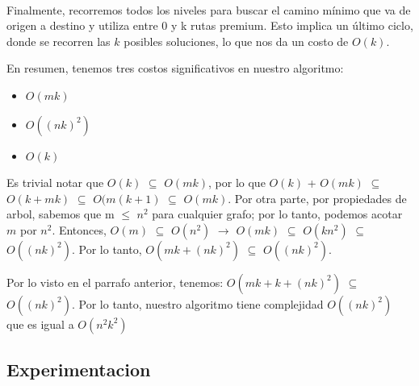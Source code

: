 \\
\par
Finalmente, recorremos todos los niveles para buscar el camino mínimo que va de origen a destino y utiliza entre 0 y k rutas premium. Esto implica un último ciclo, donde se recorren las $k$ posibles soluciones, lo que nos da un costo de $O(k)$.
\\
\par
En resumen, tenemos tres costos significativos en nuestro algoritmo:
\begin{itemize}
\item $O(mk)$
\item $O((nk)^2)$
\item $O(k)$
\end{itemize}
Es trivial notar que $O(k)$ $\subseteq$ $O(mk)$, por lo que $O(k)$ + $O(mk)$ $\subseteq$ $O(k + mk)$ $\subseteq$ $O(m(k+1)$ $\subseteq$ $O(mk)$. Por otra parte, por propiedades de arbol, sabemos que m $\leq$ $n^2$ para cualquier grafo; por lo tanto, podemos acotar $m$ por $n^2$. Entonces, $O(m)$ $\subseteq$ $O(n^2)$ $\rightarrow$ $O(mk)$ $\subseteq$ $O(kn^2)$ $\subseteq$ $O((nk)^2)$. Por lo tanto, $O(mk + (nk)^2)$ $\subseteq$ $O((nk)^2)$.
\\
\par
Por lo visto en el parrafo anterior, tenemos: $O(mk + k + (nk)^2)$ $\subseteq$ $O((nk)^2)$. Por lo tanto, nuestro algoritmo tiene complejidad $O((nk)^2)$ que es igual a $O(n^2k^2)$
\subsection{Experimentacion}

\pagebreak